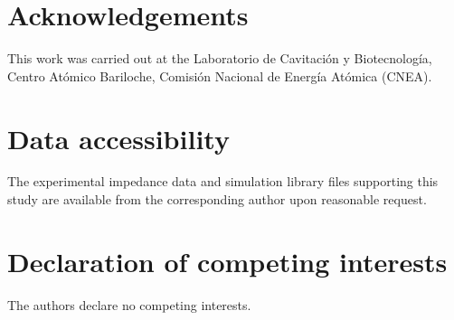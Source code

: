 \documentclass[english, 10pt, a4paper]{article}
\begin{document}
\section*{Acknowledgements}
This work was carried out at the Laboratorio de Cavitación y 
Biotecnología, Centro Atómico Bariloche, Comisión Nacional de Energía 
Atómica (CNEA). 

\section*{Data accessibility}
The experimental impedance data and simulation library files supporting 
this study are available from the corresponding author upon reasonable 
request.

\section*{Declaration of competing interests}
The authors declare no competing interests.



\end{document}
